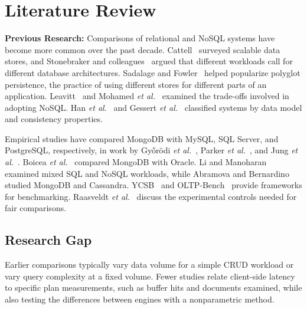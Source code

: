 \documentclass[10pt,a4paper,twocolumn]{article}
\begin{document}
\section{Literature Review}

\textbf{Previous Research:}
Comparisons of relational and NoSQL systems have become more common over the past decade. Cattell~\cite{cattell2011scalable} surveyed scalable data stores, and Stonebraker and colleagues~\cite{stonebraker2007end} argued that different workloads call for different database architectures. Sadalage and Fowler~\cite{sadalage2012nosql} helped popularize polyglot persistence, the practice of using different stores for different parts of an application. Leavitt~\cite{leavitt2010nosql} and Mohamed \emph{et al.}~\cite{mohamed2014relational} examined the trade-offs involved in adopting NoSQL. Han \emph{et al.}~\cite{han2011survey} and Gessert \emph{et al.}~\cite{gessert2017nosql} classified systems by data model and consistency properties.

Empirical studies have compared MongoDB with MySQL, SQL Server, and PostgreSQL, respectively, in work by Gy\H{o}r\"{o}di \emph{et al.}~\cite{gyorodi2015comparative}, Parker \emph{et al.}~\cite{parker2013comparing}, and Jung \emph{et al.}~\cite{jung2015mongodb}. Boicea \emph{et al.}~\cite{boicea2012mongodb} compared MongoDB with Oracle. Li and Manoharan~\cite{li2013performance} examined mixed SQL and NoSQL workloads, while Abramova and Bernardino~\cite{abramova2013nosql} studied MongoDB and Cassandra. YCSB~\cite{cooper2010ycsb} and OLTP-Bench~\cite{difallah2013oltpbench} provide frameworks for benchmarking. Raasveldt \emph{et al.}~\cite{raasveldt2018fair} discuss the experimental controls needed for fair comparisons.

\subsection{Research Gap}
Earlier comparisons typically vary data volume for a simple CRUD workload or vary query complexity at a fixed volume. Fewer studies relate client-side latency to specific plan measurements, such as buffer hits and documents examined, while also testing the differences between engines with a nonparametric method.
\end{document}

